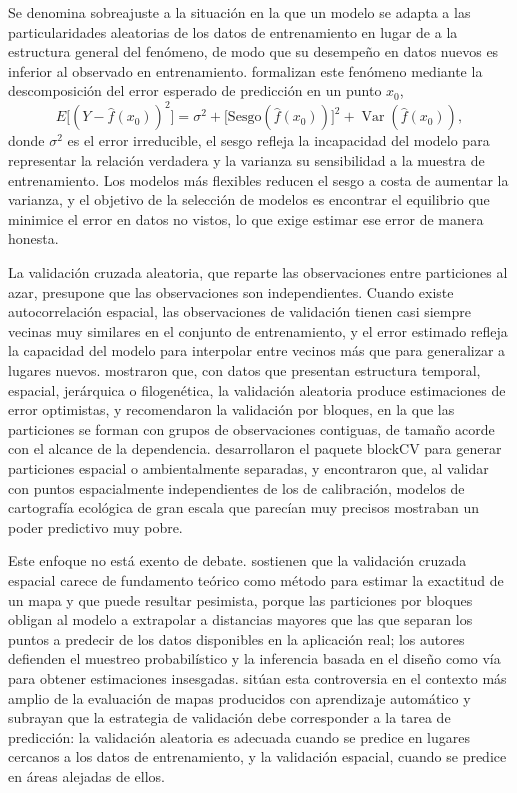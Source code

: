 Se denomina sobreajuste a la situación en la que un modelo se adapta a las particularidades
aleatorias de los datos de entrenamiento en lugar de a la estructura general del fenómeno,
de modo que su desempeño en datos nuevos es inferior al observado en entrenamiento.
\textcite{hastie2009} formalizan este fenómeno mediante la descomposición del error esperado
de predicción en un punto $x_0$,
\[
  E\bigl[(Y - \hat{f}(x_0))^2\bigr] = \sigma^2 + \bigl[\mathrm{Sesgo}(\hat{f}(x_0))\bigr]^2
    + \operatorname{Var}(\hat{f}(x_0)),
\]
donde $\sigma^2$ es el error irreducible, el sesgo refleja la incapacidad del modelo para
representar la relación verdadera y la varianza su sensibilidad a la muestra de
entrenamiento. Los modelos más flexibles reducen el sesgo a costa de aumentar la varianza, y
el objetivo de la selección de modelos es encontrar el equilibrio que minimice el error en
datos no vistos, lo que exige estimar ese error de manera honesta.

La validación cruzada aleatoria, que reparte las observaciones entre particiones al azar,
presupone que las observaciones son independientes. Cuando existe autocorrelación espacial,
las observaciones de validación tienen casi siempre vecinas muy similares en el conjunto de
entrenamiento, y el error estimado refleja la capacidad del modelo para interpolar entre
vecinos más que para generalizar a lugares nuevos. \textcite{roberts2017} mostraron que, con
datos que presentan estructura temporal, espacial, jerárquica o filogenética, la validación
aleatoria produce estimaciones de error optimistas, y recomendaron la validación por
bloques, en la que las particiones se forman con grupos de observaciones contiguas, de
tamaño acorde con el alcance de la dependencia. \textcite{valavi2019} desarrollaron el
paquete blockCV para generar particiones espacial o ambientalmente separadas, y
\textcite{ploton2020} encontraron que, al validar con puntos espacialmente independientes de
los de calibración, modelos de cartografía ecológica de gran escala que parecían muy
precisos mostraban un poder predictivo muy pobre.

Este enfoque no está exento de debate. \textcite{wadoux2021} sostienen que la validación
cruzada espacial carece de fundamento teórico como método para estimar la exactitud de un
mapa y que puede resultar pesimista, porque las particiones por bloques obligan al modelo a
extrapolar a distancias mayores que las que separan los puntos a predecir de los datos
disponibles en la aplicación real; los autores defienden el muestreo probabilístico y la
inferencia basada en el diseño como vía para obtener estimaciones insesgadas.
\textcite{meyer2022} sitúan esta controversia en el contexto más amplio de la evaluación de
mapas producidos con aprendizaje automático y subrayan que la estrategia de validación debe
corresponder a la tarea de predicción: la validación aleatoria es adecuada cuando se predice
en lugares cercanos a los datos de entrenamiento, y la validación espacial, cuando se
predice en áreas alejadas de ellos.

